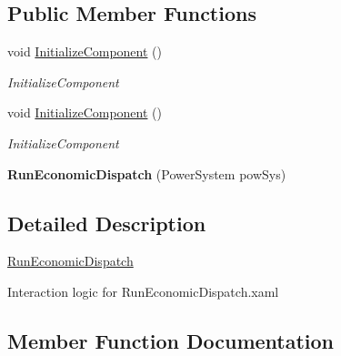 \subsection*{Public Member Functions}
\begin{DoxyCompactItemize}
\item 
void \hyperlink{class_power_system_planning_wpf_app_1_1_o_p_f_1_1_run_economic_dispatch_adb304aa76ae18ccc2e1b962a69e7f317}{Initialize\+Component} ()
\begin{DoxyCompactList}\small\item\em Initialize\+Component \end{DoxyCompactList}\item 
void \hyperlink{class_power_system_planning_wpf_app_1_1_o_p_f_1_1_run_economic_dispatch_adb304aa76ae18ccc2e1b962a69e7f317}{Initialize\+Component} ()
\begin{DoxyCompactList}\small\item\em Initialize\+Component \end{DoxyCompactList}\item 
{\bfseries Run\+Economic\+Dispatch} (Power\+System pow\+Sys)\hypertarget{class_power_system_planning_wpf_app_1_1_o_p_f_1_1_run_economic_dispatch_a6a4ed89dc560b436fc5e27c52c1db101}{}\label{class_power_system_planning_wpf_app_1_1_o_p_f_1_1_run_economic_dispatch_a6a4ed89dc560b436fc5e27c52c1db101}

\end{DoxyCompactItemize}


\subsection{Detailed Description}
\hyperlink{class_power_system_planning_wpf_app_1_1_o_p_f_1_1_run_economic_dispatch}{Run\+Economic\+Dispatch} 

Interaction logic for Run\+Economic\+Dispatch.\+xaml 

\subsection{Member Function Documentation}
